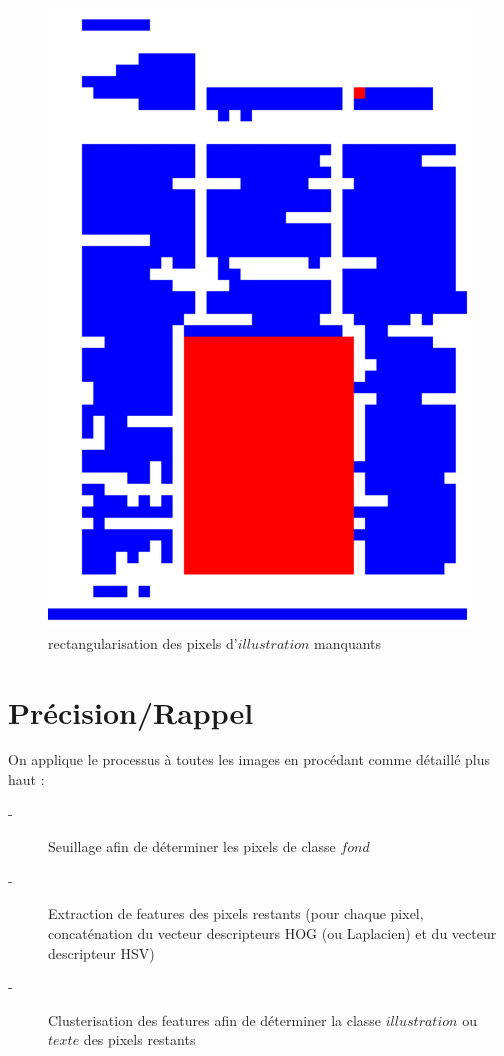 \documentclass{book}
\begin{document}
\begin{figure}[H]
\begin{center}
\includegraphics[scale=0.06]{images/rect_50_res_hog_hsv_kmeans_2.jpg}
\end{center}
\caption{\og rectangularisation \fg des pixels d'$illustration$ manquants}
\label{rect4}
\end{figure}

\clearpage

\chapter{Précision/Rappel}

On applique le processus à toutes les images en procédant comme détaillé plus haut :

\begin{description}
 \item[-] Seuillage afin de déterminer les pixels de classe $fond$
 \item[-] Extraction de features des pixels restants (pour chaque pixel, concaténation du vecteur descripteurs HOG (ou Laplacien) et du vecteur descripteur HSV)
 \item[-] Clusterisation des features afin de déterminer la classe $illustration$ ou $texte$ des pixels restants
\end{description}
\end{document}

